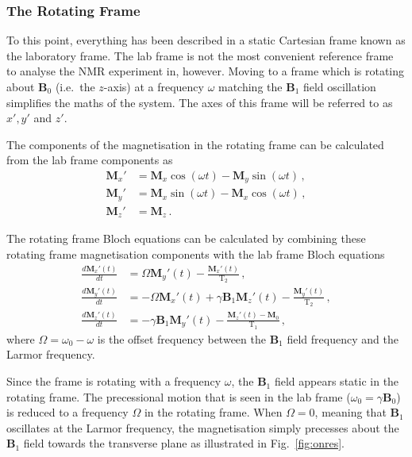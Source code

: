 \subsubsection{The Rotating Frame}
To this point, everything has been described in a static Cartesian frame known as the laboratory frame. 
The lab frame is not the most convenient reference frame to analyse the \ac{NMR} experiment in, however.
Moving to a frame which is rotating about $\mathbf{B}_0$ (i.e.\ the $z$-axis) at a frequency $\omega$ matching the $\mathbf{B}_1$ field oscillation simplifies the maths of the system. 
The axes of this frame will be referred to as $x', y'$ and $z'$. 

The components of the magnetisation in the rotating frame can be calculated from the lab frame components as \cite{DeGraaf2007}
\begin{align}
	\mathbf{M}_x' &= \mathbf{M}_x\cos(\omega t) - \mathbf{M}_y\sin(\omega t)\,,\\
	\mathbf{M}_y' &= \mathbf{M}_x\sin(\omega t) - \mathbf{M}_x\cos(\omega t)\,,\\
	\mathbf{M}_z' &= \mathbf{M}_z\,.
\end{align}

The rotating frame Bloch equations can be calculated by combining these rotating frame magnetisation components with the lab frame Bloch equations\cite{DeGraaf2007}
\begin{align}
	\frac{d\mathbf{M}_x'(t)}{dt} &= \Omega\mathbf{M}_y'(t) - \frac{\mathbf{M}_x'(t)}{\mathrm{T}_2}\,,\label{eq:blochx}\\
	\frac{d\mathbf{M}_y'(t)}{dt} &= -\Omega\mathbf{M}_x'(t) + \gamma\mathbf{B}_1\mathbf{M}_z'(t) - \frac{\mathbf{M}_y'(t)}{\mathrm{T}_2}\,,\label{eq:blochy}\\
	\frac{d\mathbf{M}_z'(t)}{dt} &= -\gamma\mathbf{B}_1\mathbf{M}_y'(t) - \frac{\mathbf{M}_z'(t) - \mathbf{M}_0}{\mathrm{T}_1}\,,\label{eq:blochz}
\end{align} 
where $\Omega = \omega_0 - \omega$ is the offset frequency between the $\mathbf{B}_1$ field frequency and the Larmor frequency. 

Since the frame is rotating with a frequency $\omega$, the $\mathbf{B}_1$ field appears static in the rotating frame. 
The precessional motion that is seen in the lab frame ($\omega_0 = \gamma\mathbf{B}_0$) is reduced to a frequency $\Omega$ in the rotating frame. 
When $\Omega = 0$, meaning that $\mathbf{B}_1$ oscillates at the Larmor frequency, the magnetisation simply precesses about the $\mathbf{B}_1$ field towards the transverse plane as illustrated in Fig.\ \ref{fig:onres}. 

